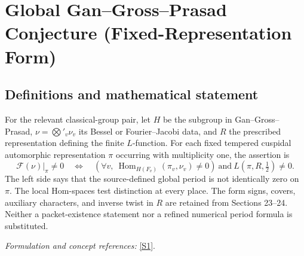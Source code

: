 \documentclass[11pt,a4paper]{article}
\newcommand{\sref}[2]{\hyperlink{source:#1:#2}{[S#2]}}
\newif\ifshowcatalogue
\newcommand{\cataloguescope}[1]{\ifshowcatalogue
 \paragraph{Exact scope in the supplied catalogue.}
 \begin{quote}\small #1\end{quote}\fi}
\numberwithin{equation}{section}
\begin{document}
\setcounter{section}{0}
\clearpage
\section*{\texorpdfstring{Global Gan–Gross–Prasad Conjecture (Fixed-Representation Form)}{Global Gan–Gross–Prasad Conjecture (Fixed-Representation Form)}}\label{30006977}
\subsection{Definitions and mathematical statement}
For the relevant classical-group pair, let $H$ be the subgroup in Gan--Gross--Prasad, $\nu=\bigotimes'_v\nu_v$ its Bessel or Fourier--Jacobi data, and $R$ the prescribed representation defining the finite $L$-function. For each fixed tempered cuspidal automorphic representation $\pi$ occurring with multiplicity one, the assertion is
\[
 \mathcal F(\nu)|_\pi\ne0
 \quad\Longleftrightarrow\quad
 \left(\forall v,\ \operatorname{Hom}_{H(F_v)}(\pi_v,\nu_v)\ne0\right)
 \ \text{and}\ L(\pi,R,\tfrac12)\ne0.
\]
The left side says that the source-defined global period is not identically zero on $\pi$. The local Hom-spaces test distinction at every place. The form signs, covers, auxiliary characters, and inverse twist in $R$ are retained from Sections 23--24. Neither a packet-existence statement nor a refined numerical period formula is substituted.
\par\smallskip\textit{Formulation and concept references:} \sref{30006977}{1}.
\cataloguescope{For every number field F, let E be F, a quadratic extension, or F\ensuremath{\times}F, and let W\ensuremath{\subset}V be a nondegenerate relevant pair with form sign epsilon, split W-perp, and epsilon*(-1)\textasciicircum{}dim(W-perp)=-1; a two-dimensional orthogonal V or W is required to be nonsplit. Use exactly the groups, covers, Bessel/Fourier–Jacobi representation nu and auxiliary data of Gan–Gross–Prasad Section 23, and R of Section 24, including the skew-hermitian character mu and its matching inverse twist in R. For every irreducible tempered representation pi occurring with multiplicity one in the cuspidal automorphic spectrum, Conjecture 24.1 asserts: the global period F(nu) is nonzero on pi if and only if Hom\_H(F\_v)(pi\_v,nu\_v) is nonzero for every place v and L(pi,R,1/2) is nonzero. Quantification is over all data permitted there, including relevant orthogonal, hermitian, symplectic/metaplectic and skew-hermitian cases. This is the fixed-representation equivalence, not the refined period identity or packet-existence formulation.}
\end{document}
